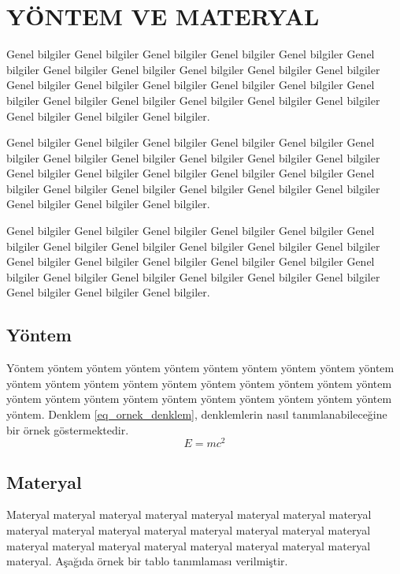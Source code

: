 \chapter{YÖNTEM VE MATERYAL}

Genel bilgiler Genel bilgiler Genel bilgiler Genel bilgiler Genel bilgiler Genel bilgiler Genel bilgiler Genel bilgiler Genel bilgiler Genel bilgiler Genel bilgiler Genel bilgiler Genel bilgiler Genel bilgiler Genel bilgiler Genel bilgiler Genel bilgiler Genel bilgiler Genel bilgiler Genel bilgiler Genel bilgiler Genel bilgiler Genel bilgiler Genel bilgiler Genel bilgiler.

Genel bilgiler Genel bilgiler Genel bilgiler Genel bilgiler Genel bilgiler Genel bilgiler Genel bilgiler Genel bilgiler Genel bilgiler Genel bilgiler Genel bilgiler Genel bilgiler Genel bilgiler Genel bilgiler Genel bilgiler Genel bilgiler Genel bilgiler Genel bilgiler Genel bilgiler Genel bilgiler Genel bilgiler Genel bilgiler Genel bilgiler Genel bilgiler Genel bilgiler.

Genel bilgiler Genel bilgiler Genel bilgiler Genel bilgiler Genel bilgiler Genel bilgiler Genel bilgiler Genel bilgiler Genel bilgiler Genel bilgiler Genel bilgiler Genel bilgiler Genel bilgiler Genel bilgiler Genel bilgiler Genel bilgiler Genel bilgiler Genel bilgiler Genel bilgiler Genel bilgiler Genel bilgiler Genel bilgiler Genel bilgiler Genel bilgiler Genel bilgiler.

\section{Yöntem}
Yöntem yöntem yöntem yöntem yöntem yöntem yöntem yöntem yöntem yöntem yöntem yöntem yöntem yöntem yöntem yöntem yöntem yöntem yöntem yöntem yöntem yöntem yöntem yöntem yöntem yöntem yöntem yöntem yöntem yöntem yöntem. Denklem \ref{eq_ornek_denklem}, denklemlerin nasıl tanımlanabileceğine bir örnek göstermektedir.
\begin{equation}
E = mc^2
\label{eq_ornek_denklem}
\end{equation}

\section{Materyal}
Materyal materyal materyal materyal materyal materyal materyal materyal materyal materyal materyal materyal materyal materyal materyal materyal materyal materyal materyal materyal materyal materyal materyal materyal materyal. Aşağıda örnek bir tablo tanımlaması verilmiştir.

